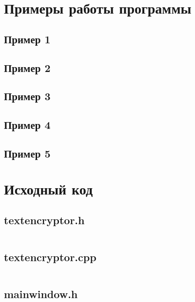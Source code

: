 \documentclass[utf8x, 14pt, bold, times]{G7-32} %
\begin{document}
\chapter{Примеры работы программы}

\section{Пример 1}



\section{Пример 2}



\section{Пример 3}



\section{Пример 4}



\section{Пример 5}



\chapter{Исходный код}

\section{textencryptor.h}

\inputminted[fontsize=\footnotesize, breaklines]{cpp}{../../src/textencryptor.h}

\section{textencryptor.cpp}

\inputminted[fontsize=\footnotesize, breaklines]{cpp}{../../src/textencryptor.cpp}

\section{mainwindow.h}
\end{document}
